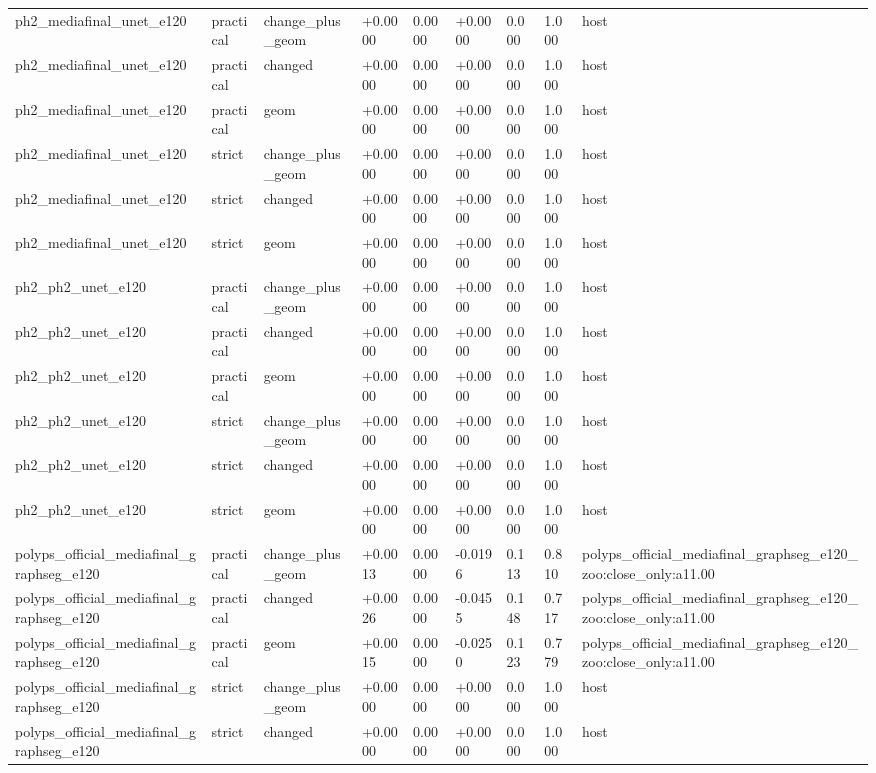 \begin{table}[t]
\begin{tabular}{lllllllll}
ph2\_mediafinal\_unet\_e120 & practical & change\_plus\_geom & +0.0000 & 0.0000 & +0.0000 & 0.000 & 1.000 & host \\
ph2\_mediafinal\_unet\_e120 & practical & changed & +0.0000 & 0.0000 & +0.0000 & 0.000 & 1.000 & host \\
ph2\_mediafinal\_unet\_e120 & practical & geom & +0.0000 & 0.0000 & +0.0000 & 0.000 & 1.000 & host \\
ph2\_mediafinal\_unet\_e120 & strict & change\_plus\_geom & +0.0000 & 0.0000 & +0.0000 & 0.000 & 1.000 & host \\
ph2\_mediafinal\_unet\_e120 & strict & changed & +0.0000 & 0.0000 & +0.0000 & 0.000 & 1.000 & host \\
ph2\_mediafinal\_unet\_e120 & strict & geom & +0.0000 & 0.0000 & +0.0000 & 0.000 & 1.000 & host \\
ph2\_ph2\_unet\_e120 & practical & change\_plus\_geom & +0.0000 & 0.0000 & +0.0000 & 0.000 & 1.000 & host \\
ph2\_ph2\_unet\_e120 & practical & changed & +0.0000 & 0.0000 & +0.0000 & 0.000 & 1.000 & host \\
ph2\_ph2\_unet\_e120 & practical & geom & +0.0000 & 0.0000 & +0.0000 & 0.000 & 1.000 & host \\
ph2\_ph2\_unet\_e120 & strict & change\_plus\_geom & +0.0000 & 0.0000 & +0.0000 & 0.000 & 1.000 & host \\
ph2\_ph2\_unet\_e120 & strict & changed & +0.0000 & 0.0000 & +0.0000 & 0.000 & 1.000 & host \\
ph2\_ph2\_unet\_e120 & strict & geom & +0.0000 & 0.0000 & +0.0000 & 0.000 & 1.000 & host \\
polyps\_official\_mediafinal\_graphseg\_e120 & practical & change\_plus\_geom & +0.0013 & 0.0000 & -0.0196 & 0.113 & 0.810 & polyps\_official\_mediafinal\_graphseg\_e120\_zoo:close\_only:a11.00 \\
polyps\_official\_mediafinal\_graphseg\_e120 & practical & changed & +0.0026 & 0.0000 & -0.0455 & 0.148 & 0.717 & polyps\_official\_mediafinal\_graphseg\_e120\_zoo:close\_only:a11.00 \\
polyps\_official\_mediafinal\_graphseg\_e120 & practical & geom & +0.0015 & 0.0000 & -0.0250 & 0.123 & 0.779 & polyps\_official\_mediafinal\_graphseg\_e120\_zoo:close\_only:a11.00 \\
polyps\_official\_mediafinal\_graphseg\_e120 & strict & change\_plus\_geom & +0.0000 & 0.0000 & +0.0000 & 0.000 & 1.000 & host \\
polyps\_official\_mediafinal\_graphseg\_e120 & strict & changed & +0.0000 & 0.0000 & +0.0000 & 0.000 & 1.000 & host \\

\end{tabular}
\end{table}
